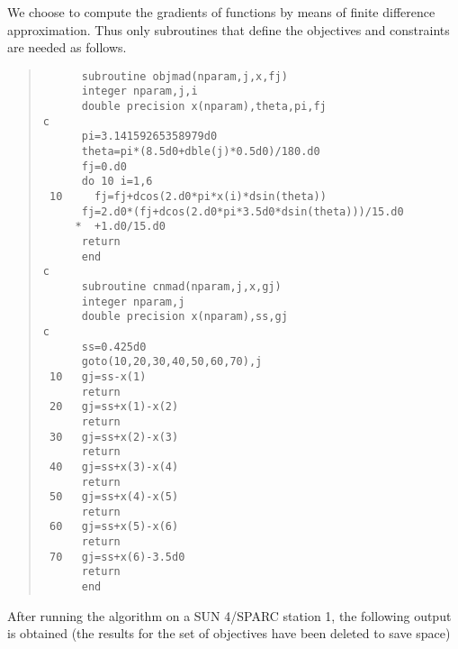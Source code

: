 We choose to compute the gradients of functions by means of
finite difference approximation. Thus only subroutines that
define the objectives and constraints are needed as follows.
\begin{quote}
\begin{verbatim}
      subroutine objmad(nparam,j,x,fj)
      integer nparam,j,i
      double precision x(nparam),theta,pi,fj
c
      pi=3.14159265358979d0
      theta=pi*(8.5d0+dble(j)*0.5d0)/180.d0
      fj=0.d0
      do 10 i=1,6
 10     fj=fj+dcos(2.d0*pi*x(i)*dsin(theta))
      fj=2.d0*(fj+dcos(2.d0*pi*3.5d0*dsin(theta)))/15.d0
     *  +1.d0/15.d0   
      return
      end
c     
      subroutine cnmad(nparam,j,x,gj)
      integer nparam,j
      double precision x(nparam),ss,gj
c
      ss=0.425d0
      goto(10,20,30,40,50,60,70),j
 10   gj=ss-x(1)
      return
 20   gj=ss+x(1)-x(2)
      return
 30   gj=ss+x(2)-x(3)
      return
 40   gj=ss+x(3)-x(4)
      return
 50   gj=ss+x(4)-x(5)
      return
 60   gj=ss+x(5)-x(6)
      return
 70   gj=ss+x(6)-3.5d0
      return
      end
\end{verbatim}
\end{quote}
After running the algorithm on a SUN 4/SPARC station 1,
the following output
is obtained (the results for the set of objectives have been deleted to
save space)
